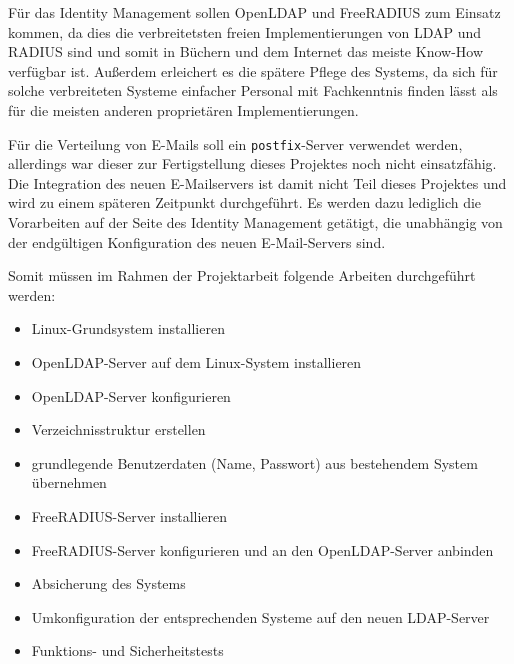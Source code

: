 \documentclass[11pt,a4paper,titlepage=firstiscover,headsepline,bibtotoc]{scrartcl} %
\begin{document}
Für das Identity Management sollen OpenLDAP und FreeRADIUS zum Einsatz kommen, da dies die verbreitetsten freien Implementierungen von LDAP und RADIUS sind und somit in Büchern und dem Internet das meiste Know-How verfügbar ist. Außerdem erleichert es die spätere Pflege des Systems, da sich für solche verbreiteten Systeme einfacher Personal mit Fachkenntnis finden lässt als für die meisten anderen proprietären Implementierungen.

Für die Verteilung von E-Mails soll ein \texttt{postfix}-Server verwendet werden, allerdings war dieser zur Fertigstellung dieses Projektes noch nicht einsatzfähig. Die Integration des neuen E-Mailservers ist damit nicht Teil dieses Projektes und wird zu einem späteren Zeitpunkt durchgeführt. Es werden dazu lediglich die Vorarbeiten auf der Seite des Identity Management getätigt, die unabhängig von der endgültigen Konfiguration des neuen E-Mail-Servers sind.

\medskip \noindent 		%
Somit müssen im Rahmen der Projektarbeit folgende Arbeiten durchgeführt werden: 
\begin{itemize}
\item Linux-Grundsystem installieren
\item OpenLDAP-Server auf dem Linux-System installieren
\item OpenLDAP-Server konfigurieren
\item Verzeichnisstruktur erstellen
\item grundlegende Benutzerdaten (Name, Passwort) aus bestehendem System übernehmen
\item FreeRADIUS-Server installieren
\item FreeRADIUS-Server konfigurieren und an den OpenLDAP-Server anbinden
\item Absicherung des Systems
\item Umkonfiguration der entsprechenden Systeme auf den neuen LDAP-Server
\item Funktions- und Sicherheitstests
\end{itemize}
\end{document}
